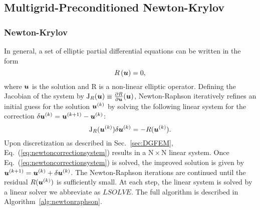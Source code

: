 \subsection{Multigrid-Preconditioned Newton-Krylov}

\subsubsection{Newton-Krylov}

In general, a set of elliptic partial differential equations can be written in the form
%
\begin{equation}\label{eq:Ru=0}
  R\left(\boldsymbol{u} \right) = 0,
\end{equation}
%
where $\boldsymbol{u}$ is the solution and R is a non-linear elliptic operator.
Defining the Jacobian of the system by
%
$\mathrm{J}_{R}(\boldsymbol{u}) \equiv \frac{\partial R}{\partial \boldsymbol{u}}(\boldsymbol{u})$,
%
Newton-Raphson iteratively refines an initial guess for the solution
$\boldsymbol{u}^{(k)}$ by solving the following 
linear system for the correction $\delta \boldsymbol{u}^{(k)} = \boldsymbol{u}^{(k+1)} -
\boldsymbol{u}^{(k)}$:
%
\begin{equation}
\label{eq:newtoncorrectionsystem}
\mathrm{J}_R(\boldsymbol{u}^{(k)})\delta \boldsymbol{u}^{(k)} = -R(\boldsymbol{u}^{(k)}).
\end{equation}
%
Upon discretization as described in Sec.~\ref{sec:DGFEM}, Eq.~(\ref{eq:newtoncorrectionsystem}) results in
  a $\mathrm{N} \times \mathrm{N}$ linear system.
Once Eq.~(\ref{eq:newtoncorrectionsystem}) is solved, the improved solution is given by $\boldsymbol{u}^{(k+1)}=\boldsymbol{u}^{(k)}+\delta \boldsymbol{u}^{(k)}$.
  The Newton-Raphson iterations are continued until the residual $R(\boldsymbol{u}^{(k)})$ is sufficiently small. At each step, the linear system is solved by a linear solver we abbreviate as $LSOLVE$. The full algorithm is described in Algorithm~\ref{alg:newtonraphson}.


